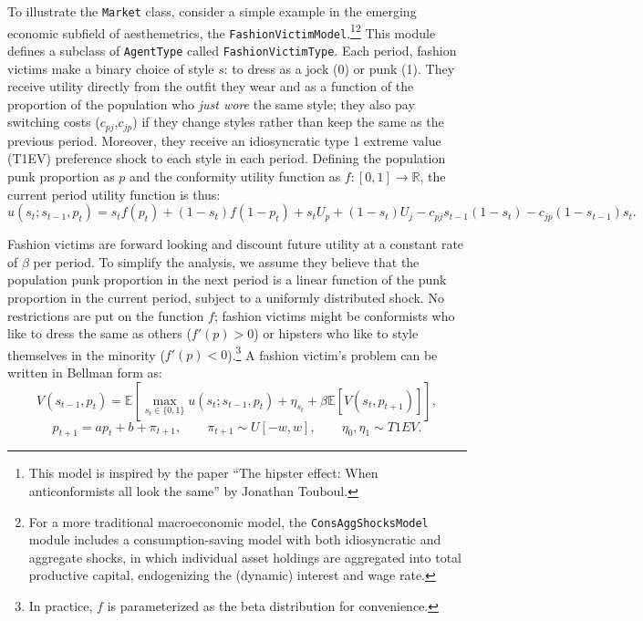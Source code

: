 \documentclass[12pt,titlepage,letterpaper]{econtex}
\providecommand{\E}{\mathbb{E}}
\begin{document}
{To illustrate the \texttt{Market} class, consider a simple example in the emerging economic subfield of aesthemetrics, the \texttt{FashionVictimModel}.\footnote{This model is inspired by the paper ``The hipster effect: When anticonformists all look the same'' by Jonathan Touboul.}\footnote{For a more traditional macroeconomic model, the \texttt{ConsAggShocksModel} module includes a consumption-saving model with both idiosyncratic and aggregate shocks, in which individual asset holdings are aggregated into total productive capital, endogenizing the (dynamic) interest and wage rate.}  This module defines a subclass of \texttt{AgentType} called \texttt{FashionVictimType}.  Each period, fashion victims make a binary choice of style $s$: to dress as a jock (0) or punk (1).  They receive utility directly from the outfit they wear and as a function of the proportion of the population who \textit{just wore} the same style; they also pay switching costs ($c_{pj}$,$c_{jp}$) if they change styles rather than keep the same as the previous period.  Moreover, they receive an idiosyncratic type 1 extreme value (T1EV) preference shock to each style in each period.  Defining the population punk proportion as $p$ and the conformity utility function as $f:[0,1]\rightarrow \mathbb{R}$, the current period utility function is thus:
\begin{equation*}
u(s_t;s_{t-1},p_t) = s_t f(p_t) + (1-s_t) f(1-p_t) + s_t U_p + (1-s_t) U_j - c_{pj} s_{t-1}(1-s_t) - c_{jp}(1-s_{t-1})s_t.
\end{equation*}

Fashion victims are forward looking and discount future utility at a constant rate of $\beta$ per period.  To simplify the analysis, we assume they believe that the population punk proportion in the next period is a linear function of the punk proportion in the current period, subject to a uniformly distributed shock.  No restrictions are put on the function $f$; fashion victims might be conformists who like to dress the same as others ($f'(p) > 0$) or hipsters who like to style themselves in the minority ($f'(p) < 0$).\footnote{In practice, $f$ is parameterized as the beta distribution for convenience.}  A fashion victim's problem can be written in Bellman form as:
\begin{equation*}
V(s_{t-1},p_t) = \E \left[ \max_{s_t \in \{0,1\}} u(s_t;s_{t-1},p_t) + \eta_{s_t} + \beta \E \left[ V(s_t,p_{t+1}) \right] \right], 
\end{equation*}
\begin{equation*}
p_{t+1} = a p_t + b + \pi_{t+1}, \qquad \pi_{t+1} \sim U[-w,w], \qquad \eta_0,\eta_1 \sim T1EV.
\end{equation*}

}
\end{document}
